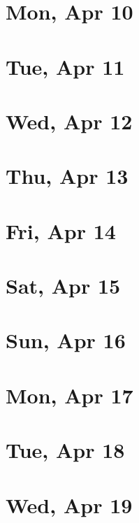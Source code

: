 	\section{Mon, Apr 10}
		
		
	\section{Tue, Apr 11}
		
		
	\section{Wed, Apr 12}
		
		
	\section{Thu, Apr 13}
		
		
	\section{Fri, Apr 14}
		
		
	\section{Sat, Apr 15}
		
		
	\section{Sun, Apr 16}
		
		
	\section{Mon, Apr 17}
		
		
	\section{Tue, Apr 18}
		
		
	\section{Wed, Apr 19}
		
		
